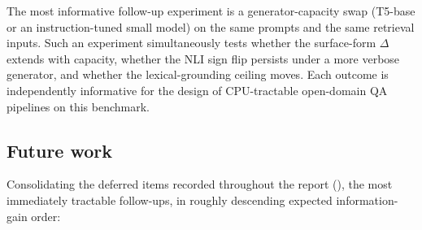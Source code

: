 \documentclass[11pt,a4paper]{article}
\begin{document}
The most informative follow-up experiment is a generator-capacity
swap (T5-base or an instruction-tuned small model) on the same
prompts and the same retrieval inputs.  Such an experiment
simultaneously tests whether the surface-form $\Delta$ extends
with capacity, whether the NLI sign flip persists under a more
verbose generator, and whether the lexical-grounding ceiling
moves.  Each outcome is independently informative for the design
of CPU-tractable open-domain QA pipelines on this benchmark.

\subsection*{Future work}
\label{sec:future-work}

Consolidating the deferred items recorded throughout the report
(), the most immediately tractable
follow-ups, in roughly descending expected information-gain order:
\end{document}

